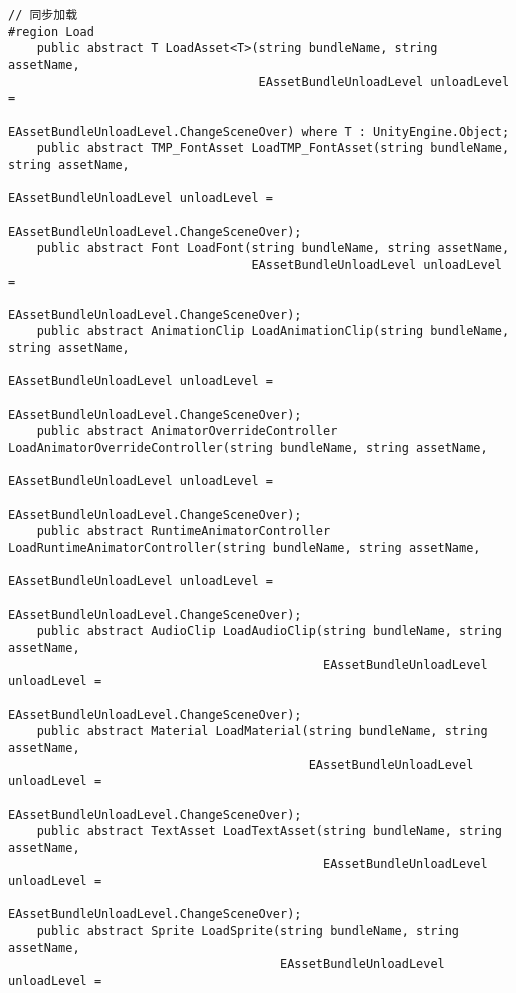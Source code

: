 \documentclass[9pt, b5paper]{article}
\begin{document}
\begin{itemize}
\begin{verbatim}
// 同步加载    
#region Load
    public abstract T LoadAsset<T>(string bundleName, string assetName, 
                                   EAssetBundleUnloadLevel unloadLevel = 
                                   EAssetBundleUnloadLevel.ChangeSceneOver) where T : UnityEngine.Object;
    public abstract TMP_FontAsset LoadTMP_FontAsset(string bundleName, string assetName, 
                                                    EAssetBundleUnloadLevel unloadLevel = 
                                                    EAssetBundleUnloadLevel.ChangeSceneOver);
    public abstract Font LoadFont(string bundleName, string assetName, 
                                  EAssetBundleUnloadLevel unloadLevel = 
                                  EAssetBundleUnloadLevel.ChangeSceneOver);
    public abstract AnimationClip LoadAnimationClip(string bundleName, string assetName, 
                                                    EAssetBundleUnloadLevel unloadLevel = 
                                                    EAssetBundleUnloadLevel.ChangeSceneOver);
    public abstract AnimatorOverrideController LoadAnimatorOverrideController(string bundleName, string assetName, 
                                                                              EAssetBundleUnloadLevel unloadLevel = 
                                                                              EAssetBundleUnloadLevel.ChangeSceneOver);
    public abstract RuntimeAnimatorController LoadRuntimeAnimatorController(string bundleName, string assetName, 
                                                                            EAssetBundleUnloadLevel unloadLevel = 
                                                                            EAssetBundleUnloadLevel.ChangeSceneOver);
    public abstract AudioClip LoadAudioClip(string bundleName, string assetName, 
                                            EAssetBundleUnloadLevel unloadLevel = 
                                            EAssetBundleUnloadLevel.ChangeSceneOver);
    public abstract Material LoadMaterial(string bundleName, string assetName, 
                                          EAssetBundleUnloadLevel unloadLevel = 
                                          EAssetBundleUnloadLevel.ChangeSceneOver);
    public abstract TextAsset LoadTextAsset(string bundleName, string assetName, 
                                            EAssetBundleUnloadLevel unloadLevel = 
                                            EAssetBundleUnloadLevel.ChangeSceneOver);
    public abstract Sprite LoadSprite(string bundleName, string assetName, 
                                      EAssetBundleUnloadLevel unloadLevel = 

\end{verbatim}
\end{itemize}
\end{document}
